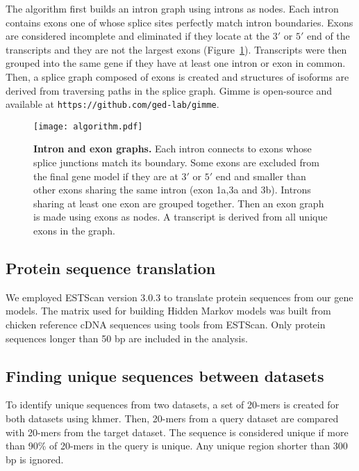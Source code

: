 The algorithm first builds an intron graph using introns as nodes.  Each intron
contains exons one of whose splice sites perfectly match intron boundaries.
Exons are considered incomplete and eliminated if they locate at the $3'$ or
$5'$ end of the transcripts and they are not the largest exons
(Figure~\ref{algorithm}).  Transcripts were then grouped into the same gene if
they have at least one intron or exon in common.  Then, a splice graph composed
of exons is created and structures of isoforms are derived from traversing
paths in the splice graph.  Gimme is open-source and available at
\texttt{https://github.com/ged-lab/gimme}.

\begin{figure}[!ht]
\begin{center}
\texttt{[image: algorithm.pdf]}
\end{center}
\caption{
\textbf{Intron and exon graphs.}
Each intron connects to exons whose splice junctions match its
boundary.  Some exons are excluded from the final gene model if
they are at $3\prime$ or $5\prime$ end and smaller than other
exons sharing the same intron (exon 1a,3a and 3b).  Introns
sharing at least one exon are grouped together.  Then an exon
graph is made using exons as nodes.  A transcript is derived from
all unique exons in the graph.
}
\label{algorithm}
\end{figure}


\subsection{Protein sequence translation}

We employed ESTScan version 3.0.3 to translate protein sequences from our gene
models.  The matrix used for building Hidden Markov models was built from chicken
reference cDNA sequences using tools from ESTScan. Only protein sequences longer
than 50 bp are included in the analysis.

\subsection{Finding unique sequences between datasets}

To identify unique sequences from two datasets, a set of 20-mers is created for
both datasets using khmer.  Then, 20-mers from a query dataset are
compared with 20-mers from the target dataset.  The sequence is considered
unique if more than 90\% of 20-mers in the query is unique.  Any unique region
shorter than 300 bp is ignored.

